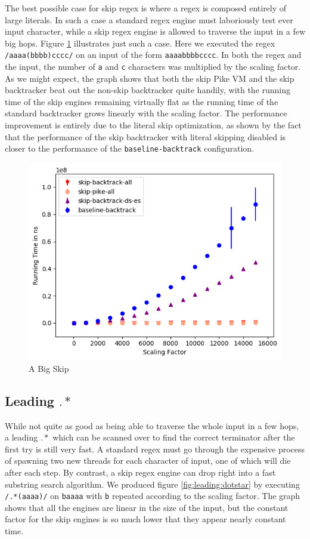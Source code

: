 The best possible case for skip regex is where a regex is composed
entirely of large literals. In such a case a standard regex engine
must laboriously test ever input character, while a skip regex
engine is allowed to traverse the input in a few big hops. Figure
\ref{fig:a:big:skip} illustrates just such a case. Here we executed the
regex \verb'/aaaa(bbbb)cccc/' on an input of the form \verb'aaaabbbbcccc'.
In both the regex and the input, the number of \verb'a' and \verb'c'
characters was multiplied by the scaling factor. As we might expect,
the graph shows that both the skip Pike VM and the skip backtracker
beat out the non-skip backtracker quite handily, with the running time
of the skip engines remaining virtually flat as the running
time of the standard backtracker grows linearly with the scaling factor.
The performance improvement is entirely due to the literal skip
optimization, as shown by the fact that the performance of the skip
backtracker with literal skipping disabled is closer to the performance
of the \verb'baseline-backtrack' configuration.

\begin{figure}
\caption{A Big Skip}
\label{fig:a:big:skip}

\includegraphics{resources/a-big-skip.png}
\end{figure}

\subsection{Leading $.*$}

While not quite as good as being able to traverse the whole input
in a few hops, a leading $.*$ which can be scanned over to find the
correct terminator after the first try is still very fast. A standard
regex must go through the expensive process of spawning two new threads
for each character of input, one of which will die after each step.
By contrast, a skip regex engine can drop right into a fast substring
search algorithm. We produced figure \ref{fig:leading:dotstar} by executing
\verb'/.*(aaaa)/' on \verb'baaaa' with \verb'b' repeated according
to the scaling factor. The graph shows that all the engines are linear
in the size of the input, but the constant factor for the skip engines
is so much lower that they appear nearly constant time.

